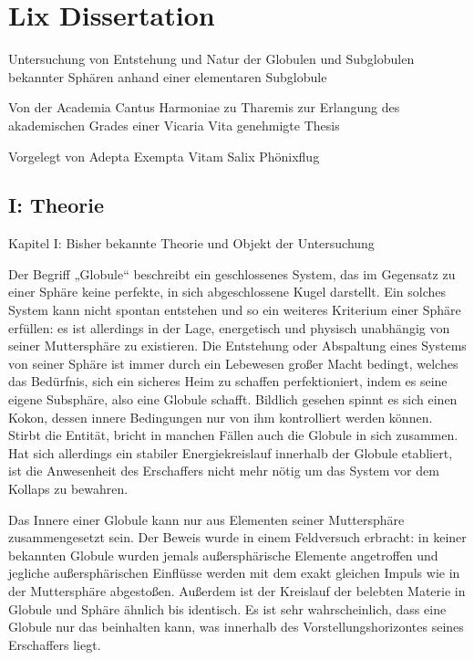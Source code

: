\documentclass[a5paper,8pt]{book}
\begin{document}
\newpage

\section{Lix Dissertation}



Untersuchung von Entstehung und Natur der Globulen und Subglobulen bekannter Sphären anhand einer elementaren Subglobule


Von der Academia Cantus Harmoniae zu Tharemis zur Erlangung des akademischen Grades einer Vicaria Vita genehmigte Thesis


Vorgelegt von Adepta Exempta Vitam Salix Phönixflug


\subsection{I: Theorie}

Kapitel I: Bisher bekannte Theorie und Objekt der Untersuchung

Der Begriff „Globule“ beschreibt ein geschlossenes System, das im Gegensatz zu einer Sphäre keine perfekte, in sich 
abgeschlossene Kugel darstellt. Ein solches System kann nicht spontan entstehen und so ein weiteres Kriterium einer 
Sphäre erfüllen: es ist allerdings in der Lage, energetisch und physisch unabhängig von seiner Muttersphäre zu existieren. 
Die Entstehung oder Abspaltung eines Systems von seiner Sphäre ist immer durch ein Lebewesen großer Macht bedingt, welches 
das Bedürfnis, sich ein sicheres Heim zu schaffen perfektioniert, indem es seine eigene Subsphäre, also eine Globule 
schafft. Bildlich gesehen spinnt es sich einen Kokon, dessen innere Bedingungen nur von ihm kontrolliert werden können. 
Stirbt die Entität, bricht in manchen Fällen auch die Globule in sich zusammen. Hat sich allerdings ein stabiler 
Energiekreislauf innerhalb der Globule etabliert, ist die Anwesenheit des Erschaffers nicht mehr nötig um das System vor 
dem Kollaps zu bewahren. 

Das Innere einer Globule kann nur aus Elementen seiner Muttersphäre zusammengesetzt sein. Der Beweis wurde in einem 
Feldversuch erbracht: in keiner bekannten Globule wurden jemals außersphärische Elemente angetroffen und jegliche 
außersphärischen Einflüsse werden mit dem exakt gleichen Impuls wie in der Muttersphäre abgestoßen. Außerdem ist der 
Kreislauf der belebten Materie in Globule und Sphäre ähnlich bis identisch. Es ist sehr wahrscheinlich, dass eine Globule 
nur das beinhalten kann, was innerhalb des Vorstellungshorizontes seines Erschaffers liegt.
\end{document}
